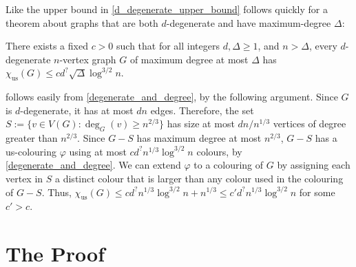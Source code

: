 \documentclass{patmorin}
\newcommand{\trn}{\chi_{\mathrm{us}}}
\begin{document}
Like the upper bound in \cite{karpas.neiman.ea:on} \cref{d_degenerate_upper_bound} follows quickly for a theorem about graphs that are both $d$-degenerate and have maximum-degree $\Delta$:

\begin{thm}\label{degenerate_and_degree}
  There exists a fixed $c>0$ such that
  for all integers $d,\Delta \ge 1$, and $n> \Delta$, every $d$-degenerate $n$-vertex graph $G$ of maximum degree at most $\Delta$ has
  $\trn(G)\leq c d^?\sqrt{\Delta}\log^{3/2} n$.
\end{thm}

 follows easily from \cref{degenerate_and_degree}, by the following argument.  Since $G$ is $d$-degenerate, it has at most $dn$ edges.  Therefore, the set $S:=\{v\in V(G):\deg_G(v)\ge n^{2/3}\}$ has size at most $dn/n^{1/3}$ vertices of degree greater than $n^{2/3}$.  Since $G-S$ has maximum degree at most $n^{2/3}$, $G-S$ has a us-colouring $\varphi$ using at most $cd^?n^{1/3}\log^{3/2} n$ colours, by \cref{degenerate_and_degree}. We can extend $\varphi$ to a colouring of $G$ by assigning each vertex in $S$ a distinct colour that is larger than any colour used in the colouring of $G-S$.  Thus, $\trn(G)\le cd^?n^{1/3}\log^{3/2} n+n^{1/3}\le c'd^?n^{1/3}\log^{3/2} n$ for some $c'>c$.


\section{The Proof}
\end{document}
